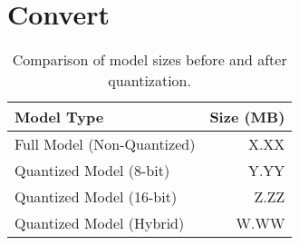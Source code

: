 \section{Convert}

\begin{table}[htb]
    \centering
    \begin{tabular}{|l|r|}
        \hline
        \textbf{Model Type} & \textbf{Size (MB)} \\ \hline
        Full Model (Non-Quantized) & X.XX \\ \hline
        Quantized Model (8-bit) & Y.YY \\ \hline
        Quantized Model (16-bit) & Z.ZZ \\ \hline
        Quantized Model (Hybrid) & W.WW \\ \hline
    \end{tabular}
    \caption{Comparison of model sizes before and after quantization.}
    \label{tab:model_sizes}
\end{table}